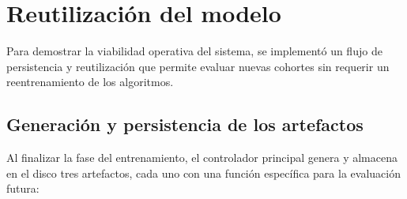 \section{Reutilización del modelo}


Para demostrar la viabilidad operativa del sistema, se implementó un flujo de persistencia y reutilización que permite evaluar nuevas cohortes sin requerir un reentrenamiento de los algoritmos.

\subsection{Generación y persistencia de los artefactos}
Al finalizar la fase del entrenamiento, el controlador principal genera y almacena en el disco tres artefactos, cada uno con una función específica para la evaluación futura:

